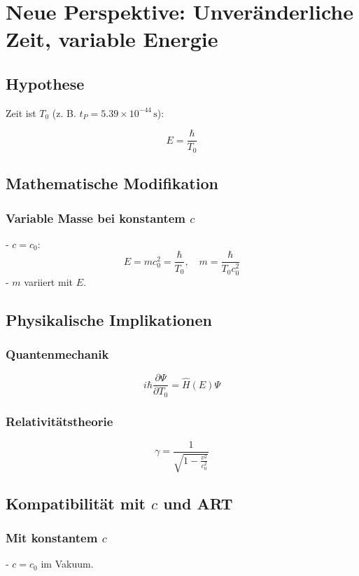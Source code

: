 \documentclass{article}
\begin{document}
	\section{Neue Perspektive: Unveränderliche Zeit, variable Energie}
	
	\subsection{Hypothese}
	
	Zeit ist \( T_0 \) (z. B. \( t_P = 5.39 \times 10^{-44} \, \text{s} \)):
	
	\[
	E = \frac{\hbar}{T_0}
	\]
	
	\subsection{Mathematische Modifikation}
	
	\subsubsection{Variable Masse bei konstantem \( c \)}
	- \( c = c_0 \):
	\[
	E = m c_0^2 = \frac{\hbar}{T_0}, \quad m = \frac{\hbar}{T_0 c_0^2}
	\]
	- \( m \) variiert mit \( E \).
	
	\subsection{Physikalische Implikationen}
	
	\subsubsection{Quantenmechanik}
	\[
	i\hbar \frac{\partial \Psi}{\partial T_0} = \hat{H}(E) \Psi
	\]
	
	\subsubsection{Relativitätstheorie}
	\[
	\gamma = \frac{1}{\sqrt{1 - \frac{v^2}{c_0^2}}}
	\]
	
	\subsection{Kompatibilität mit \( c \) und ART}
	
	\subsubsection{Mit konstantem \( c \)}
	- \( c = c_0 \) im Vakuum.
	
\end{document}
